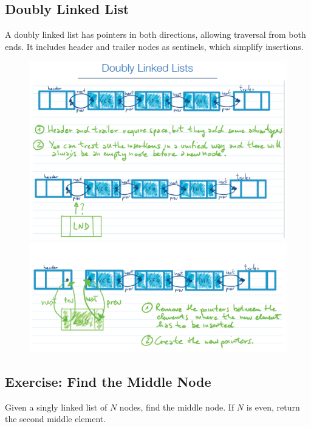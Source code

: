     \subsection{Doubly Linked List}
    A doubly linked list has pointers in both directions, allowing traversal from both ends. It includes header and trailer nodes as sentinels, which simplify insertions.
    \begin{figure}[h!]
        \centering
        \begin{minipage}{0.7\textwidth}
          \centering
          \includegraphics[width=\textwidth]{immagini/dlink1.png}
        \end{minipage}
        \hfill
        \begin{minipage}{0.7\textwidth}
          \centering
          \includegraphics[width=\textwidth]{immagini/dlink2.png}
        \end{minipage}
        \label{fig:two_images}
    \end{figure}
    \subsection{Exercise: Find the Middle Node}
    Given a singly linked list of \(N\) nodes, find the middle node. If \(N\) is even, return the second middle element.
    
